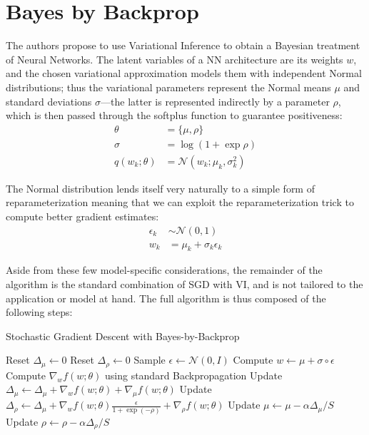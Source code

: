 \documentclass[11pt]{article}
\begin{document}
\section{Bayes by Backprop} \label{sec:bayes_by_backprop}

The authors propose to use Variational Inference to obtain a Bayesian treatment
of Neural Networks.  The latent variables of a NN architecture are its weights
$w$, and the chosen variational approximation models them with independent
Normal distributions;  thus the variational parameters represent the Normal
means $\mu$ and standard deviations $\sigma$---the latter is represented
indirectly by a parameter $\rho$, which is then passed through the softplus
function to guarantee positiveness:
%
\begin{align}
  \theta &= \{ \mu, \rho \} \\
  \sigma &= \log(1 + \exp\rho) \\
  q(w_k; \theta) &= \mathcal{N}(w_k; \mu_k, \sigma_k^2)
\end{align}


The Normal distribution lends itself very naturally to a simple form of
reparameterization meaning that we can exploit the reparameterization trick to
compute better gradient estimates:
%
\begin{align}
  \epsilon_k &\sim \mathcal{N}(0, 1) \\
  w_k &= \mu_k + \sigma_k \epsilon_k
\end{align}

Aside from these few model-specific considerations, the remainder of the
algorithm is the standard combination of SGD with VI, and is not tailored to
the application or model at hand.  The full algorithm is thus composed of the
following steps:

\begin{algorithm}
\caption{Stochastic Gradient Descent with Bayes-by-Backprop}
\begin{algorithmic}[1]
  \Repeat
  \State Reset $\Delta_\mu \gets 0$
  \State Reset $\Delta_\rho \gets 0$
  \State Sample $\epsilon \gets \mathcal{N}(0, I)$
  \State Compute $w \gets \mu + \sigma \circ \epsilon$
  \State Compute $\nabla_w f(w; \theta)$ using standard Backpropagation
  \State Update $\Delta_\mu \gets \Delta_\mu + \nabla_w f(w; \theta) + \nabla_\mu f(w; \theta)$
  \State Update $\Delta_\rho \gets \Delta_\mu + \nabla_w f(w; \theta) \frac{\epsilon}{1+\exp(-\rho)} + \nabla_\rho f(w; \theta)$
  \EndFor
  \State Update $\mu \gets \mu - \alpha \Delta_\mu / S$
  \State Update $\rho \gets \rho - \alpha \Delta_\rho / S$
\end{algorithmic}
\end{algorithm}
\end{document}
